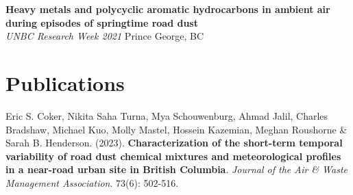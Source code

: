 \documentclass[11pt]{article}
\begin{document}
\vspace{8pt}

\noindent\textbf{Heavy metals and polycyclic aromatic hydrocarbons in ambient air during episodes of springtime road dust} \\
\textit{UNBC Research Week 2021} \hfill Prince George, BC

\section{Publications}

\vspace{4pt}

Eric S. Coker, Nikita Saha Turna, Mya Schouwenburg, Ahmad Jalil, Charles Bradshaw, Michael Kuo, Molly Mastel, Hossein Kazemian, Meghan Roushorne \& Sarah B. Henderson. (2023). \textbf{Characterization of the short-term temporal variability of road dust chemical mixtures and meteorological profiles in a near-road urban site in British Columbia}. \textit{Journal of the Air \& Waste Management Association}. 73(6): 502-516.
\end{document}
